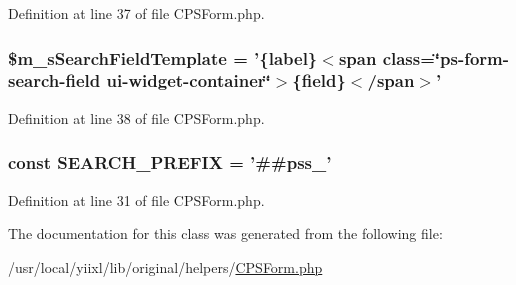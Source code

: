 Definition at line 37 of file CPSForm.php.

\hypertarget{classCPSForm_af73e8ea30d5e912f9a7d9cd6e950dd54}{
\subsubsection[{\$m\_\-sSearchFieldTemplate}]{\setlength{\rightskip}{0pt plus 5cm}\$m\_\-sSearchFieldTemplate = '\{label\}$<$span class=\char`\"{}ps-\/form-\/search-\/field ui-\/widget-\/container\char`\"{}$>$\{field\}$<$/span$>$'}}
\label{classCPSForm_af73e8ea30d5e912f9a7d9cd6e950dd54}


Definition at line 38 of file CPSForm.php.

\hypertarget{classCPSForm_a5928a64b83ef2247c22303d1afb01781}{
\subsubsection[{SEARCH\_\-PREFIX}]{\setlength{\rightskip}{0pt plus 5cm}const {\bf SEARCH\_\-PREFIX} = '\#\#pss\_\-'}}
\label{classCPSForm_a5928a64b83ef2247c22303d1afb01781}


Definition at line 31 of file CPSForm.php.



The documentation for this class was generated from the following file:\begin{DoxyCompactItemize}
\item 
/usr/local/yiixl/lib/original/helpers/\hyperlink{CPSForm_8php}{CPSForm.php}\end{DoxyCompactItemize}
